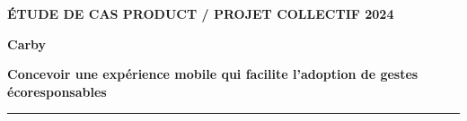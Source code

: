 \documentclass[a4paper,10pt]{article}
\newcommand{\eyebrow}[1]{{\fontsize{8.5}{10}\selectfont\bfseries\color{teal}\MakeUppercase{#1}}}
\begin{document}
\fontsize{9.2}{12.4}\selectfont
\raggedright
\thispagestyle{fancy}

\begin{minipage}[t]{.73\linewidth}
  \vspace{0pt}
  \eyebrow{Étude de cas Product \quad / \quad Projet collectif 2024}\par\vspace{7pt}
  {\fontsize{31}{33}\selectfont\bfseries\color{navydark}Carby}\par\vspace{5pt}
  {\fontsize{13.2}{17.0}\selectfont\bfseries\color{navy}Concevoir une expérience mobile qui facilite l'adoption de gestes écoresponsables}\par
\end{minipage}\hfill
\begin{minipage}[t]{.22\linewidth}
  \vspace{0pt}
  \vspace{3pt}
\end{minipage}
\vspace{10pt}
\color{border}\rule{\linewidth}{.7pt}\color{ink}
\vspace{12pt}
\end{document}
